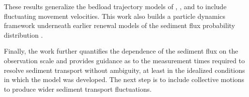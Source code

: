 These results generalize the bedload trajectory models of \citet{Einstein1937}, \citet{Lisle1998}, and \citet{Lajeunesse2017} to include fluctuating movement velocities. This work also builds a particle dynamics framework underneath earlier renewal models of the sediment flux probability distribution \citep{Lajeunesse2010,Ancey2020}.
 
Finally, the work further quantifies the dependence of the sediment flux on the observation scale and provides guidance as to the measurement times required to resolve sediment transport without ambiguity, at least in the idealized conditions in which the model was developed.
The next step is to include collective motions to produce wider sediment transport fluctuations.

